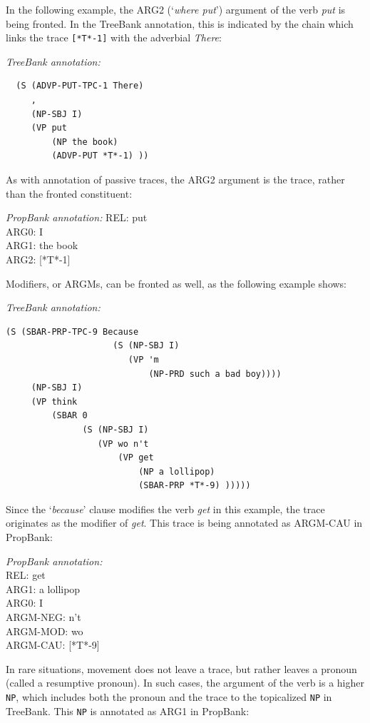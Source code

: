 \documentclass[11pt]{report}
\begin{document}
In the following example, the ARG2 (`\textit{where put}') argument of the verb \textit{put} is being fronted. In the TreeBank annotation, this is indicated by the chain which links the trace \texttt{[*T*-1]} with the adverbial \textit{There}:

\textit{TreeBank annotation:}
\begin{verbatim}
  (S (ADVP-PUT-TPC-1 There)
     ,
     (NP-SBJ I)
     (VP put
         (NP the book)
         (ADVP-PUT *T*-1) ))
\end{verbatim}

As with annotation of passive traces, the ARG2 argument is the trace, rather than the fronted constituent:

\textit{PropBank annotation:}
REL:	put\\
ARG0:	I\\
ARG1:	the book\\
ARG2:	[*T*-1] 

Modifiers, or ARGMs, can be fronted as well, as the following example shows:

\textit{TreeBank annotation:}
\begin{verbatim}
(S (SBAR-PRP-TPC-9 Because
                     (S (NP-SBJ I)
                        (VP 'm
                            (NP-PRD such a bad boy))))
     (NP-SBJ I)
     (VP think
         (SBAR 0
               (S (NP-SBJ I)
                  (VP wo n't
                      (VP get
                          (NP a lollipop)
                          (SBAR-PRP *T*-9) )))))
\end{verbatim}
Since the `\textit{because}' clause modifies the verb \textit{get} in this example, the trace originates as the modifier of \textit{get}. This trace is being annotated as ARGM-CAU in PropBank:

\textit{PropBank annotation:}\\
REL:		get\\
ARG1:		a lollipop\\
ARG0:		I\\
ARGM-NEG:	n't\\
ARGM-MOD:	wo\\
ARGM-CAU:	[*T*-9]

In rare situations, movement does not leave a trace, but rather leaves a pronoun (called a resumptive pronoun). In such cases, the argument of the verb is a higher \texttt{NP}, which includes both the pronoun and the trace to the topicalized \texttt{NP} in TreeBank. This \texttt{NP} is annotated as ARG1 in PropBank:
\end{document}
